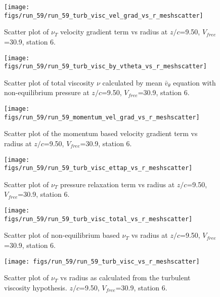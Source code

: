 \begin{figure}[H]
\centering
\texttt{[image: figs/run\_59/run\_59\_turb\_visc\_vel\_grad\_vs\_r\_meshscatter]}
\caption{Scatter plot of $\nu_T$ velocity gradient term vs radius at $z/c$=9.50, $V_{free}$=30.9, station 6.}
\end{figure}


\begin{figure}[H]
\centering
\texttt{[image: figs/run\_59/run\_59\_turb\_visc\_by\_vtheta\_vs\_r\_meshscatter]}
\caption{Scatter plot of total viscosity $\nu$ calculated by mean $\bar{v}_{\theta}$ equation with non-equilibrium pressure at $z/c$=9.50, $V_{free}$=30.9, station 6.}
\end{figure}


\begin{figure}[H]
\centering
\texttt{[image: figs/run\_59/run\_59\_momentum\_vel\_grad\_vs\_r\_meshscatter]}
\caption{Scatter plot of the momentum based velocity gradient term vs radius at $z/c$=9.50, $V_{free}$=30.9, station 6.}
\end{figure}


\begin{figure}[H]
\centering
\texttt{[image: figs/run\_59/run\_59\_turb\_visc\_ettap\_vs\_r\_meshscatter]}
\caption{Scatter plot of $\nu_T$ pressure relaxation term vs radius at $z/c$=9.50, $V_{free}$=30.9, station 6.}
\end{figure}


\begin{figure}[H]
\centering
\texttt{[image: figs/run\_59/run\_59\_turb\_visc\_total\_vs\_r\_meshscatter]}
\caption{Scatter plot of non-equilibrium based $\nu_T$ vs radius at $z/c$=9.50, $V_{free}$=30.9, station 6.}
\end{figure}


\begin{figure}[H]
\centering
\texttt{[image: figs/run\_59/run\_59\_turb\_visc\_vs\_r\_meshscatter]}
\caption{Scatter plot of $\nu_T$ vs radius as calculated from the turbulent viscosity hypothesis. $z/c$=9.50, $V_{free}$=30.9, station 6.}
\end{figure}



